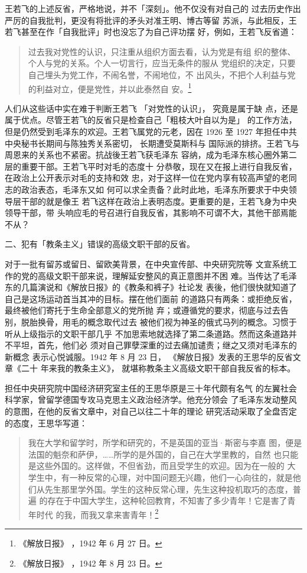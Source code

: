 王若飞的上述反省，严格地说，并不「深刻」。他不仅没有对自己的
过去历史作出严厉的自我批判，更没有将批评的矛头对准王明、博古等留
苏派，与此相反，王若飞甚至在作「自我批评」时也没忘了为自己评功摆
好，例如，王若飞反省道：
\begin{quote}
{\fzwkai 过去我对党性的认识，只注重从组织方面去看，认为党是有组
织的整体、个人与党的关系。个人一切言行，应当无条件的服从
党组织的决定，只要自己埋头为党工作，不闹名誉，不闹地位，不
出风头，不把个人利益与党的利益对立，便是党性，并以此泰然自
安。\footnote{《解放日报》
，1942 年 6 月 27 日。}} 
\end{quote}

人们从这些话中实在难于判断王若飞
「对党性的认识」， 究竟是属于缺
点，还是属于优点。尽管王若飞的反省只是检查自己「粗枝大叶自以为是」
的工作方法，但是仍然受到毛泽东的欢迎。王若飞属党的元老，因在 1926
至 1927 年担任中共中央秘书长期间与陈独秀关系密切，
长期遭受莫斯科与
国际派的排挤。王若飞与周恩来的关系也不紧密。抗战後王若飞获毛泽东
容纳，成为毛泽东核心圈外第二层的重要干部。王若飞平时对毛的态度十
分恭敬，现在又在报上进行自我反省，在政治上公开表示对毛的支持和效
忠，对于这样一位在党内享有较高声望的老同志的政治表态，毛泽东又如
何可以求全责备？此时此地，毛泽东所要求于中央领导层干部的就是像王
若飞这样在政治上表明态度。更重要的是，王若飞身为中央领导干部，带
头响应毛的号召进行自我反省，其影响不可谓不大，其他干部焉能不从？

二、犯有「教条主义」错误的高级文职干部的反省。

对于一批有留苏或留日、留欧美背景，在中央宣传部、中央研究院等
文宣系统工作的党的高级文职干部来说，理解延安整风的真正意图并不困
难。当传达了毛泽东的几篇演说和《解放日报》的《教条和裤子》社论发
表後，他们很快就知道了自己是这场运动首当其冲的目标。摆在他们面前
的道路只有两条：或拒绝反省，最终被他们寄托于生命全部意义的党所抛
弃；或遵循党的要求，彻底与过去告别，脱胎换骨，用毛的概念取代过去
被他们视为神圣的俄式马列的概念。习惯于听从上级指示的文职干部几乎
不加思索地就选择了第二条道路。然而这条道路并不平坦，首先，他们必
须对自己罪孽深重的过去痛加谴责；继之又须对毛泽东的新概念
表示心悦诚服。1942 年 8 月 23 日，
《解放日报》发表的王思华的反省文章《二十
年来我的教条主义》，
就堪称教条主义高级文职干部自我反省的标本。

担任中央研究院中国经济研究室主任的王思华原是三十年代颇有名气
的左翼社会科学家，曾留学德国专攻马克思主义政治经济学。他充分领会
了毛泽东发动整风的意图，在他的反省文章中，对自己以往二十年的理论
研究活动采取了全盘否定的态度，王思华写道：
\begin{quote}
{\fzwkai 我在大学和留学时，所学和研究的，不是英国的亚当·斯密与李嘉
图，便是法国的魁奈和萨伊，……所学的是外国的，自己在大学里教的，自然
也只能是这些外国的。这样做，不但省劲，而且受学生的欢迎。因为在一般的
大学生中，有一种反常的心理，对中国问题无兴趣，他们一心向往的，就是他
们从先生那里学外国。学生的这种反常心理，先生这种投机取巧的态度，普遍
的存在于中国大学生，这种轮回教育，不知害了多少青年！它是害了青年时代
的我，而我又拿来害青年！\footnote{《解放日报》
，1942 年 8 月 23 日。}} 
\end{quote}


